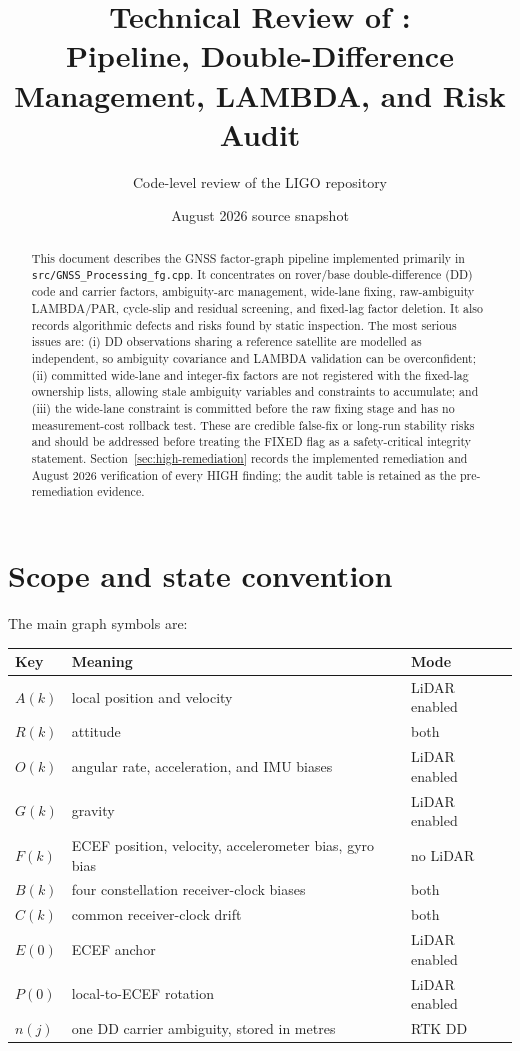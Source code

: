 \documentclass[11pt,a4paper]{article}
\title{Technical Review of \code{GNSS\_Processing\_fg}:\\
Pipeline, Double-Difference Management, LAMBDA, and Risk Audit}
\author{Code-level review of the LIGO repository}
\date{August 2026 source snapshot}
\newcommand{\code}[1]{\texttt{#1}}
\begin{document}
\maketitle

\begin{abstract}
This document describes the GNSS factor-graph pipeline implemented primarily in
\code{src/GNSS\_Processing\_fg.cpp}.  It concentrates on rover/base
double-difference (DD) code and carrier factors, ambiguity-arc management,
wide-lane fixing, raw-ambiguity LAMBDA/PAR, cycle-slip and residual screening,
and fixed-lag factor deletion.  It also records algorithmic defects and risks
found by static inspection.  The most serious issues are: (i) DD observations
sharing a reference satellite are modelled as independent, so ambiguity
covariance and LAMBDA validation can be overconfident; (ii) committed wide-lane
and integer-fix factors are not registered with the fixed-lag ownership lists,
allowing stale ambiguity variables and constraints to accumulate; and (iii) the
wide-lane constraint is committed before the raw fixing stage and has no
measurement-cost rollback test.  These are credible false-fix or long-run
stability risks and should be addressed before treating the FIXED flag as a
safety-critical integrity statement.  Section~\ref{sec:high-remediation}
records the implemented remediation and August 2026 verification of every
HIGH finding; the audit table is retained as the pre-remediation evidence.
\end{abstract}

\tableofcontents

\section{Scope and state convention}

The main graph symbols are:
\begin{center}
\begin{tabular}{lll}
\toprule
Key & Meaning & Mode \\
\midrule
$A(k)$ & local position and velocity & LiDAR enabled \\
$R(k)$ & attitude & both \\
$O(k)$ & angular rate, acceleration, and IMU biases & LiDAR enabled \\
$G(k)$ & gravity & LiDAR enabled \\
$F(k)$ & ECEF position, velocity, accelerometer bias, gyro bias & no LiDAR \\
$B(k)$ & four constellation receiver-clock biases & both \\
$C(k)$ & common receiver-clock drift & both \\
$E(0)$ & ECEF anchor & LiDAR enabled \\
$P(0)$ & local-to-ECEF rotation & LiDAR enabled \\
$n(j)$ & one DD carrier ambiguity, stored in metres & RTK DD \\
\bottomrule
\end{tabular}
\end{center}
\end{document}
